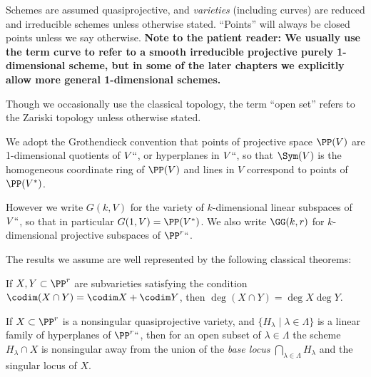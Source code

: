 Schemes 
are assumed 
quasiprojective,
%
%
and \emph{varieties} (including
curves) are 
reduced and irreducible schemes
unless otherwise stated.
%
%
``Points''
will always be closed points unless we say otherwise. 
{\bf Note to the patient reader: We usually use the term curve to refer to a smooth irreducible projective purely 1-dimensional scheme, but in some of the later chapters we explicitly allow more general 1-dimensional schemes.}

Though we occasionally use the classical topology, 
the term ``open set'' refers to the 
Zariski topology
unless otherwise stated.
%

We adopt the 
Grothendieck convention
that points of projective space 
%
%
%
%
%
$\PP(V)$ are 1-dimensional quotients of $V` `$, or hyperplanes in $V` `$, so that
$\Sym(V)$ is the homogeneous coordinate ring of $\PP(V)$ and lines in $V$ correspond to points of $\PP(V^*)$.
%

However we write $G(k,V)$ for the variety of $k$-dimensional linear subspaces of $V` `$, so that in particular $G(1,V) = \PP(V^*)$.
We also write $\GG(k,r)$ for $k$-dimen\-sional
projective subspaces of $\PP^r` `$.

The results we assume are
 well represented by the following classical theorems:

\begin{theorem}
If $X,Y\subset \PP^r$ are subvarieties 
satisfying the condition
$\codim(X\cap Y) = \codim X + \codim Y$,
then $\deg (X\cap Y) = \deg X\deg Y$.%
%
\end{theorem}

\begin{theorem}\label{Bertini}
If $X\subset \PP^r$  is a nonsingular quasiprojective variety, and $\{H_\lambda \mid \lambda\in \Lambda\}$ is a linear family of hyperplanes of $\PP^r` `$, then for an open subset of $\lambda\in \Lambda$ the scheme $H_\lambda \cap X$ is nonsingular away from the union of the \emph{base locus}
$
\bigcap_{\lambda \in \Lambda} H_\lambda
$
and the singular locus of $X$.
%
\end{theorem}


